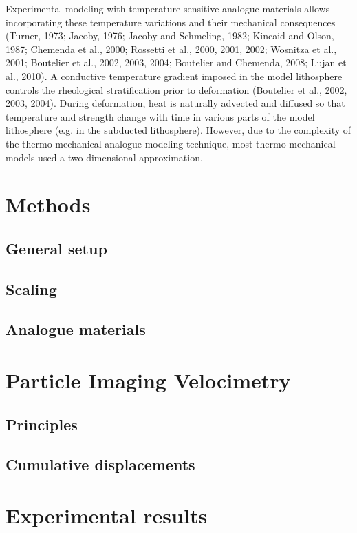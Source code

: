 \documentclass[11pt]{article}
\begin{document}
Experimental modeling with temperature-sensitive analogue materials allows incorporating these temperature variations and their mechanical consequences (Turner, 1973; Jacoby, 1976; Jacoby and Schmeling, 1982; Kincaid and Olson, 1987; Chemenda et al., 2000; Rossetti et al., 2000, 2001, 2002; Wosnitza et al., 2001; Boutelier et al., 2002, 2003, 2004; Boutelier and Chemenda, 2008; Lujan et al., 2010). A conductive temperature gradient imposed in the model lithosphere controls the rheological stratification prior to deformation (Boutelier et al., 2002, 2003, 2004). During deformation, heat is naturally advected and diffused so that temperature and strength change with time in various parts of the model lithosphere (e.g. in the subducted lithosphere). However, due to the complexity of the thermo-mechanical analogue modeling technique, most thermo-mechanical models used a two dimensional approximation.

\section*{Methods}
\subsection*{General setup}
\subsection*{Scaling}
\subsection*{Analogue materials}

\section*{Particle Imaging Velocimetry}
\subsection*{Principles}
\subsection*{Cumulative displacements}

\section*{Experimental results}
\end{document}
